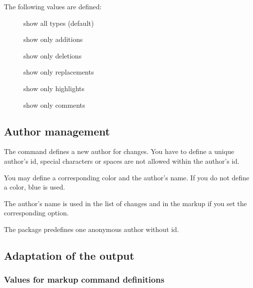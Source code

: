 The following values are defined:

\begin{description}
	\item[] show all types (default)
	\item[] show only additions
	\item[] show only deletions
	\item[] show only replacements
	\item[] show only highlights
	\item[] show only comments
\end{description}




\subsection{Author management}
\label{sec:ui:authormanagement}



The command  defines a new author for changes.
You have to define a unique author's id, special characters or spaces are not allowed within the author's id.

You may define a corresponding color and the author's name.
If you do not define a color, blue is used.

The author's name is used in the list of changes and in the markup if you set the corresponding option.

The package predefines one anonymous author without id.



\subsection{Adaptation of the output}
\label{sec:ui:customizingoutput}

\localtableofcontents

\subsubsection{Values for markup command definitions}


